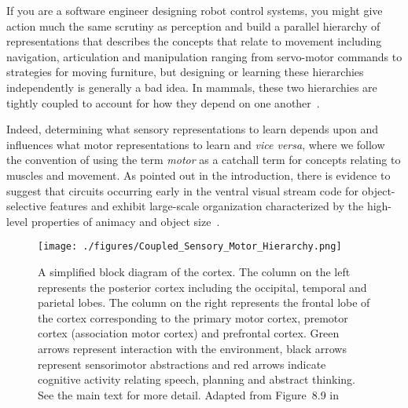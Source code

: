 If you are a software engineer designing robot control systems, you might give action much the same scrutiny as perception and build a parallel hierarchy of representations that describes the concepts that relate to movement including navigation, articulation and manipulation ranging from servo-motor commands to strategies for moving furniture, but designing or learning these hierarchies independently is generally a bad idea. In mammals, these two hierarchies are tightly coupled to account for how they depend on one another~\cite{FusterPREFRONTAL-CORTEX-15}.

Indeed, determining what sensory representations to learn depends upon and influences what motor representations to learn and {\it{vice versa}}, where we follow the convention of using the term {\it{motor}} as a catchall term for concepts relating to muscles and movement. As pointed out in the introduction, there is evidence to suggest that circuits occurring early in the ventral visual stream code for object-selective features and exhibit large-scale organization characterized by the high-level properties of animacy and object size~\cite{KonkleandCaramazzaJoN-13,LongetalPNAS-18}.


\begin{figure}
%
  \begin{center} 
    \texttt{[image: ./figures/Coupled\_Sensory\_Motor\_Hierarchy.png]} %
  \end{center}
%
  \caption{A simplified block diagram of the cortex. The column on the left represents the posterior cortex including the occipital, temporal and parietal lobes. The column on the right represents the frontal lobe of the cortex corresponding to the primary motor cortex, premotor cortex (association motor cortex) and prefrontal cortex. Green arrows represent interaction with the environment, black arrows represent sensorimotor abstractions and red arrows indicate cognitive activity relating speech, planning and abstract thinking. See the main text for more detail. Adapted from Figure~8.9 in~\cite{FusterPREFRONTAL-CORTEX-15-CHAPTER_8}}
%    
  \label{fig_coupled}
%
\end{figure}


